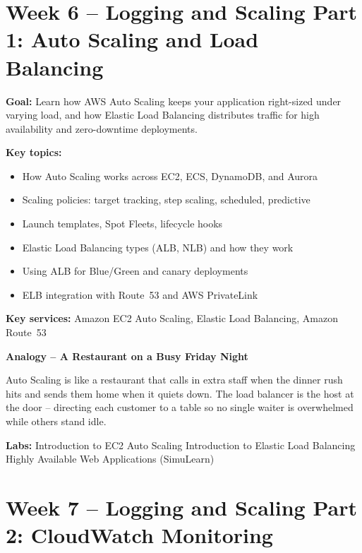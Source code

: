 \documentclass[12pt,a4paper]{article}
\begin{document}
\section{Week 6 -- Logging and Scaling Part 1: Auto Scaling and Load Balancing}

\textbf{Goal:} Learn how AWS Auto Scaling keeps your application right-sized under
varying load, and how Elastic Load Balancing distributes traffic for high availability
and zero-downtime deployments.

\textbf{Key topics:}
\begin{itemize}[leftmargin=1.5em]
  \item How Auto Scaling works across EC2, ECS, DynamoDB, and Aurora
  \item Scaling policies: target tracking, step scaling, scheduled, predictive
  \item Launch templates, Spot Fleets, lifecycle hooks
  \item Elastic Load Balancing types (ALB, NLB) and how they work
  \item Using ALB for Blue/Green and canary deployments
  \item ELB integration with Route~53 and AWS PrivateLink
\end{itemize}

\textbf{Key services:} Amazon EC2 Auto Scaling, Elastic Load Balancing, Amazon Route~53

\begin{analogybox}
\textbf{Analogy -- A Restaurant on a Busy Friday Night}

Auto Scaling is like a restaurant that calls in extra staff when the dinner rush
hits and sends them home when it quiets down. The load balancer is the host at the
door -- directing each customer to a table so no single waiter is overwhelmed while
others stand idle.
\end{analogybox}

\textbf{Labs:} Introduction to EC2 Auto Scaling \textbullet{}
Introduction to Elastic Load Balancing \textbullet{}
Highly Available Web Applications (SimuLearn)

\newpage

\section{Week 7 -- Logging and Scaling Part 2: CloudWatch Monitoring}
\end{document}
